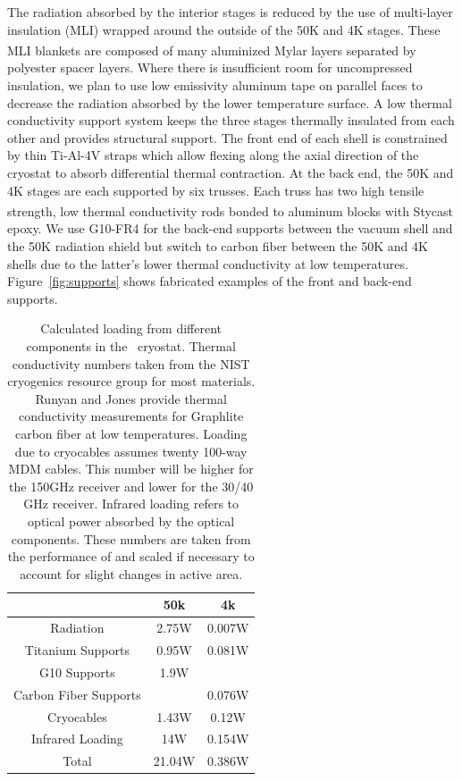 \documentclass[]{spie}
\begin{document}
The radiation absorbed by the interior stages is reduced by the use of
multi-layer insulation (MLI) wrapped around the outside of the 50K and 4K
stages. These MLI blankets are composed of many aluminized Mylar\textsuperscript{\textregistered} layers
separated by polyester spacer layers. Where there is insufficient room for
uncompressed insulation, we plan to use low emissivity aluminum tape on parallel
faces to decrease the radiation absorbed by the lower temperature surface.
A low thermal conductivity support system keeps the three stages thermally
insulated from each other and provides structural support. The front end of
each shell is constrained by thin Ti-Al-4V straps which allow flexing along the
axial direction of the cryostat to absorb differential thermal contraction. At
the back end, the 50K and 4K stages are each supported by six trusses. Each
truss has two high tensile strength, low thermal conductivity rods bonded to
aluminum blocks with Stycast\textsuperscript{\textregistered} epoxy. We use G10-FR4 for the back-end supports
between the vacuum shell and the 50K radiation shield but switch to carbon
fiber between the 50K and 4K shells due to the latter's lower thermal
conductivity at low temperatures. Figure~\ref{fig:supports} shows fabricated
examples of the front and back-end supports.

\begin{table}[b]
	\center
\begin{tabular}{|c||c|c|}
	\hline
	 & 50k & 4k \\
	 \hline
	Radiation & 2.75W & 0.007W \\
	Titanium Supports & 0.95W & 0.081W \\
	G10 Supports & 1.9W & \\
	Carbon Fiber Supports & & 0.076W\\
	Cryocables & 1.43W & 0.12W \\
	Infrared Loading & 14W & 0.154W \\
	\hline
	Total & 21.04W & 0.386W \\
	\hline
\end{tabular}

	\caption{Calculated loading from different components in the \biceparray\
	cryostat. Thermal conductivity numbers taken from the NIST cryogenics
	resource group\cite{nist} for most materials. Runyan and
	Jones\cite{runyan2008} provide thermal conductivity measurements for
	Graphlite carbon fiber at low temperatures. Loading due to cryocables
	assumes twenty 100-way MDM cables. This number will be higher for the
	150GHz receiver and lower for the 30/40 GHz receiver. Infrared loading
	refers to optical power absorbed by the optical components. These numbers
	are taken from the performance of \bicep3 and scaled if necessary to
	account for slight changes in active area.}
	\label{tab:loading}

\end{table}
\end{document}
